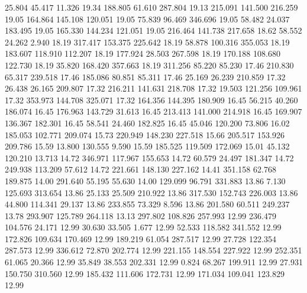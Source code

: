   25.804   45.417   11.326        19.34
 188.805   61.610  287.804        19.13
 215.091  141.500  216.259        19.05
 164.864  145.108  120.051        19.05
  75.839   96.469  346.696        19.05
  58.482   24.037  183.495        19.05
 165.330  144.234  121.051        19.05
 216.464  141.738  217.658        18.62
  58.552   24.262    2.940        18.19
 317.417  153.375  225.642        18.19
  58.878  100.316  355.053        18.19
 183.607  118.910  112.207        18.19
 177.924   28.503  267.598        18.19
 170.188  108.680  122.730        18.19
  35.820  168.420  357.663        18.19
 311.256   85.220   85.230        17.46
 210.830   65.317  239.518        17.46
 185.086   80.851   85.311        17.46
  25.169   26.239  210.859        17.32
  26.438   26.165  209.807        17.32
 216.211  141.631  218.708        17.32
  19.503  121.256  109.961        17.32
 353.973  144.708  325.071        17.32
 164.356  144.395  180.909        16.45
  56.215   40.260  186.074        16.45
 176.963  143.729   31.613        16.45
 213.413  141.000  214.918        16.45
 169.907  136.367  182.301        16.45
  58.541   24.460  182.825        16.45
  45.046  120.200   73.806        16.02
 185.053  102.771  209.074        15.73
 220.949  148.230  227.518        15.66
 205.517  153.926  209.786        15.59
  13.800  130.555    9.590        15.59
 185.525  119.509  172.069        15.01
  45.132  120.210   13.713        14.72
 346.971  117.967  155.653        14.72
  60.579   24.497  181.347        14.72
 249.938  113.209   57.612        14.72
 221.661  148.130  227.162        14.41
 351.158   62.768  189.875        14.00
 291.640   55.195   55.630        14.00
 129.099   96.791  331.883        13.86
   7.130  125.693  313.654        13.86
  25.133   25.509  210.922        13.86
 317.530  152.743  226.003        13.86
  44.800  114.341   29.137        13.86
 233.855   73.329    8.596        13.86
 201.580   60.511  249.237        13.78
 293.907  125.789  264.118        13.13
 297.802  108.826  257.993        12.99
 236.479  104.576   24.171        12.99
  30.630   33.505    1.677        12.99
  52.533  118.582  341.552        12.99
 172.826  109.634  170.469        12.99
 189.219   61.054  287.517        12.99
  27.728  122.354  287.573        12.99
 336.612   72.870  202.774        12.99
 221.155  148.554  227.922        12.99
 252.351   61.065   20.366        12.99
  35.849   38.553  202.331        12.99
   0.824   68.267  199.911        12.99
  27.931  150.750  310.560        12.99
 185.432  111.606  172.731        12.99
 171.034  109.041  123.829        12.99
